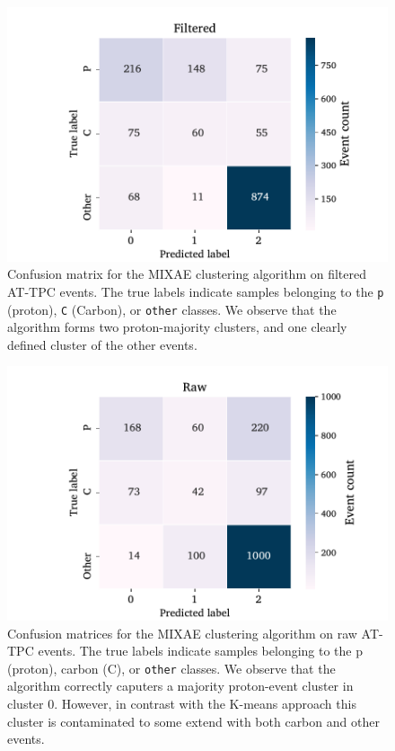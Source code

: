 \documentclass[review,number,sort&compress]{elsarticle}
\begin{document}
\begin{figure}
\centering
	\includegraphics[width=\textwidth]{custom_work/Filtered_mixae_conf_mat.pdf}
\caption[MIXAE - confusion matrices]{Confusion matrix for the MIXAE clustering algorithm on filtered AT-TPC events. The true labels indicate samples belonging to the \texttt{p} (proton), \texttt{C} (Carbon), or \texttt{other} classes. We observe that the algorithm forms two proton-majority clusters, and one clearly defined cluster of the other events. }\label{fig:mixae_confmat_filtered}
\end{figure}

\begin{figure}
\centering
	\includegraphics[width=\textwidth]{custom_work/Raw_mixae_conf_mat.pdf}
\caption[MIXAE - confusion matrices]{Confusion matrices for the MIXAE clustering algorithm on raw AT-TPC events. The true labels indicate samples belonging to the p (proton), carbon (C), or \texttt{other} classes. We observe that the algorithm correctly caputers a majority proton-event cluster in cluster 0. However, in contrast with the K-means approach this cluster is contaminated to some extend with both carbon and other events. }\label{fig:mixae_confmat_raw}
\end{figure}
\end{document}
